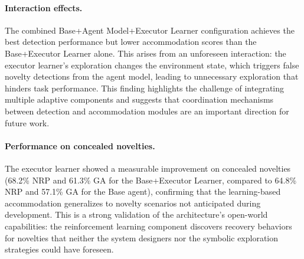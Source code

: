 \paragraph{Interaction effects.} The combined Base+Agent Model+Executor Learner configuration achieves the best detection performance but lower accommodation scores than the Base+Executor Learner alone. This arises from an unforeseen interaction: the executor learner's exploration changes the environment state, which triggers false novelty detections from the agent model, leading to unnecessary exploration that hinders task performance. This finding highlights the challenge of integrating multiple adaptive components and suggests that coordination mechanisms between detection and accommodation modules are an important direction for future work.

\paragraph{Performance on concealed novelties.} The executor learner showed a measurable improvement on concealed novelties (68.2\% NRP and 61.3\% GA for the Base+Executor Learner, compared to 64.8\% NRP and 57.1\% GA for the Base agent), confirming that the learning-based accommodation generalizes to novelty scenarios not anticipated during development. This is a strong validation of the architecture's open-world capabilities: the reinforcement learning component discovers recovery behaviors for novelties that neither the system designers nor the symbolic exploration strategies could have foreseen.